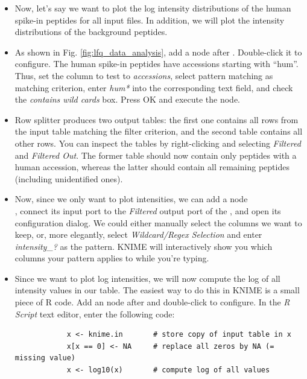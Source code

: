 \begin{itemize}
    \item Now, let's say we want to plot the log intensity distributions of the human spike-in peptides for all input files. In addition, we will plot the intensity distributions of the background peptides.
    \item As shown in Fig. \ref{fig:lfq_data_analysis}, add a  node  after . Double-click it to configure. The human spike-in peptides have accessions starting with ``hum''. Thus, set the column to test to \textit{accessions}, select pattern matching as matching criterion, enter \textit{hum*} into the corresponding text field, and check the \textit{contains wild cards} box. Press OK and execute the node.
    \item Row splitter produces two output tables: the first one contains all rows from the input table matching the filter criterion, and the second table contains all other rows. You can inspect the tables by right-clicking and selecting \textit{Filtered} and \textit{Filtered Out}. The former table should now contain only peptides with a human accession, whereas the latter should contain all remaining peptides (including unidentified ones).
    \item Now, since we only want to plot intensities, we can add a  node \\ , connect its input port to the \textit{Filtered} output port of the , and open its configuration dialog. We could either manually select the columns we want to keep, or, more elegantly, select \textit{Wildcard/Regex Selection} and enter \textit{intensity\_?} as the pattern. KNIME will interactively show you which columns your pattern applies to while you're typing.
    \item Since we want to plot log intensities, we will now compute the log of all intensity values in our table. The easiest way to do this in KNIME is a small piece of R code. Add an  node  after  and double-click to configure. In the \textit{R Script} text editor, enter the following code:
        \begin{lstlisting}
            x <- knime.in       # store copy of input table in x
            x[x == 0] <- NA     # replace all zeros by NA (= missing value)
            x <- log10(x)       # compute log of all values

\end{lstlisting}
\end{itemize}

